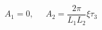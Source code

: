 \begin{equation}
A_1 = 0, \;\;\;\;\;
A_2 =\frac{2 \pi}{ L_1 L_2}  \xi\tau_3 
\label{eq:unstable-background}
\end{equation}

